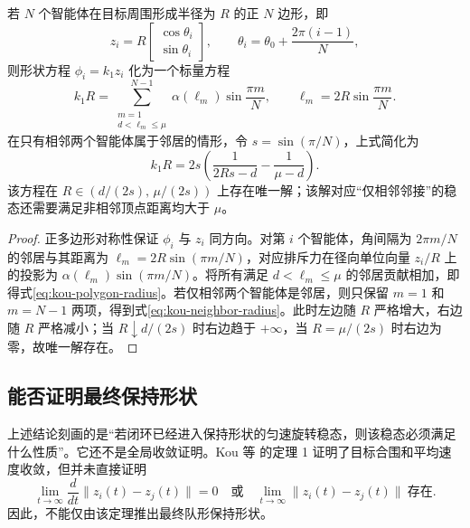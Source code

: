 \begin{theorem}[正多边形旋转稳态]
若 $N$ 个智能体在目标周围形成半径为 $R$ 的正 $N$ 边形，即
\begin{equation}
z_i=R
\begin{bmatrix}
\cos\theta_i\\
\sin\theta_i
\end{bmatrix},
\qquad
\theta_i=\theta_0+\frac{2\pi(i-1)}{N},
\end{equation}
则形状方程 $\phi_i=k_1z_i$ 化为一个标量方程
\begin{equation}
k_1R=
\sum_{\substack{m=1\\ d<\ell_m\leq\mu}}^{N-1}
\alpha(\ell_m)\sin\frac{\pi m}{N},
\qquad
\ell_m=2R\sin\frac{\pi m}{N}. \label{eq:kou-polygon-radius}
\end{equation}
在只有相邻两个智能体属于邻居的情形，令 $s=\sin(\pi/N)$，上式简化为
\begin{equation}
k_1R=2s\left(\frac{1}{2Rs-d}-\frac{1}{\mu-d}\right). \label{eq:kou-neighbor-radius}
\end{equation}
该方程在 $R\in(d/(2s),\,\mu/(2s))$ 上存在唯一解；该解对应“仅相邻邻接”的稳态还需要满足非相邻顶点距离均大于 $\mu$。
\end{theorem}

\begin{proof}
正多边形对称性保证 $\phi_i$ 与 $z_i$ 同方向。对第 $i$ 个智能体，角间隔为 $2\pi m/N$ 的邻居与其距离为 $\ell_m=2R\sin(\pi m/N)$，对应排斥力在径向单位向量 $z_i/R$ 上的投影为 $\alpha(\ell_m)\sin(\pi m/N)$。将所有满足 $d<\ell_m\leq\mu$ 的邻居贡献相加，即得式\eqref{eq:kou-polygon-radius}。若仅相邻两个智能体是邻居，则只保留 $m=1$ 和 $m=N-1$ 两项，得到式\eqref{eq:kou-neighbor-radius}。此时左边随 $R$ 严格增大，右边随 $R$ 严格减小；当 $R\downarrow d/(2s)$ 时右边趋于 $+\infty$，当 $R=\mu/(2s)$ 时右边为零，故唯一解存在。
\end{proof}

\subsection{能否证明最终保持形状}

上述结论刻画的是“若闭环已经进入保持形状的匀速旋转稳态，则该稳态必须满足什么性质”。它还不是全局收敛证明。Kou 等\cite{kouCooperativeFencingControl2022} 的定理 1 证明了目标合围和平均速度收敛，但并未直接证明
\begin{equation}
\lim_{t\to\infty}\frac{d}{dt}\|z_i(t)-z_j(t)\|=0
\quad\text{或}\quad
\lim_{t\to\infty}\|z_i(t)-z_j(t)\|\ \text{存在}.
\end{equation}
因此，不能仅由该定理推出最终队形保持形状。

